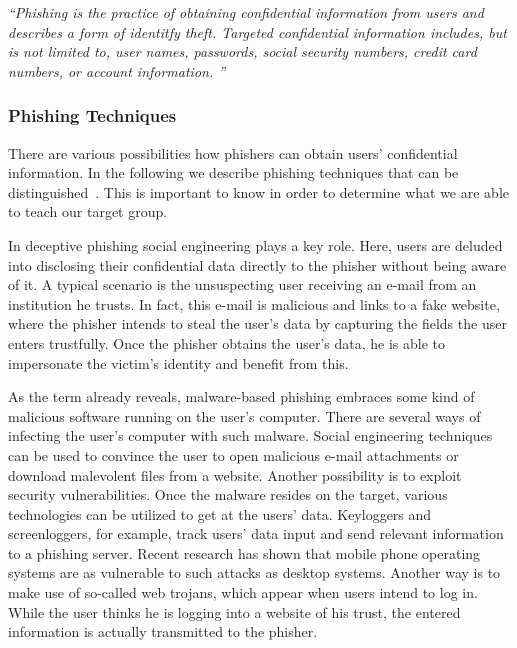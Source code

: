 \begin{center}
\textit{``Phishing is the practice of obtaining confidential information from users and describes a form of identitfy theft.
 Targeted confidential information includes, but is not limited to, user names, passwords, social security numbers, credit card numbers, or account information.
''}~\cite{jakobsson2006phishing}
\end{center}

\subsubsection{Phishing Techniques}
\label{s:phishing_techs}
There are various possibilities how phishers can obtain users' confidential information.
 In the following we describe phishing techniques that can be distinguished~\cite{jakobsson2006phishing, phishingtechniques}.
 This is important to know in order to determine what we are able to teach our target group.

\begin{description}[leftmargin=0cm]
	\item[Deceptive Phishing] In deceptive phishing social engineering plays a key role.
 Here, users are deluded into disclosing their confidential data directly to the phisher without being aware of it.
 A typical scenario is the unsuspecting user receiving an e-mail from an institution he trusts.
 In fact, this e-mail is malicious and links to a fake website, where the phisher intends to steal the user's data by capturing the fields the user enters trustfully.
 Once the phisher obtains the user's data, he is able to impersonate the victim's identity and benefit from this.

	\item[Malware Based Phishing] As the term already reveals, malware-based phishing embraces some kind of malicious software running on the user's computer.
 There are several ways of infecting the user's computer with such malware.
 Social engineering techniques can be used to convince the user to open malicious e-mail attachments or download malevolent files from a website.
 Another possibility is to exploit security vulnerabilities.
 Once the malware resides on the target, various technologies can be utilized to get at the users' data.
 Keyloggers and screenloggers, for example, track users' data input and send relevant information to a phishing server.
 Recent research has shown that mobile phone operating systems are as vulnerable to such attacks as desktop systems.
 Another way is to make use of so-called web trojans, which appear when users intend to log in.
 While the user thinks he is logging into a website of his trust, the entered information is actually transmitted to the phisher.

\end{description}

